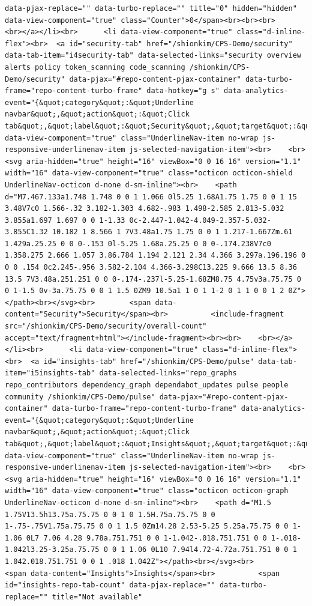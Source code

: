 \documentclass[
  letterpaper,
]{book}
\begin{document}
\begin{verbatim}
data-pjax-replace="" data-turbo-replace="" title="0" hidden="hidden" data-view-component="true" class="Counter">0</span><br><br><br>    <br></a></li><br>      <li data-view-component="true" class="d-inline-flex"><br>  <a id="security-tab" href="/shionkim/CPS-Demo/security" data-tab-item="i4security-tab" data-selected-links="security overview alerts policy token_scanning code_scanning /shionkim/CPS-Demo/security" data-pjax="#repo-content-pjax-container" data-turbo-frame="repo-content-turbo-frame" data-hotkey="g s" data-analytics-event="{&quot;category&quot;:&quot;Underline navbar&quot;,&quot;action&quot;:&quot;Click tab&quot;,&quot;label&quot;:&quot;Security&quot;,&quot;target&quot;:&quot;UNDERLINE_NAV.TAB&quot;}" data-view-component="true" class="UnderlineNav-item no-wrap js-responsive-underlinenav-item js-selected-navigation-item"><br>    <br>              <svg aria-hidden="true" height="16" viewBox="0 0 16 16" version="1.1" width="16" data-view-component="true" class="octicon octicon-shield UnderlineNav-octicon d-none d-sm-inline"><br>    <path d="M7.467.133a1.748 1.748 0 0 1 1.066 0l5.25 1.68A1.75 1.75 0 0 1 15 3.48V7c0 1.566-.32 3.182-1.303 4.682-.983 1.498-2.585 2.813-5.032 3.855a1.697 1.697 0 0 1-1.33 0c-2.447-1.042-4.049-2.357-5.032-3.855C1.32 10.182 1 8.566 1 7V3.48a1.75 1.75 0 0 1 1.217-1.667Zm.61 1.429a.25.25 0 0 0-.153 0l-5.25 1.68a.25.25 0 0 0-.174.238V7c0 1.358.275 2.666 1.057 3.86.784 1.194 2.121 2.34 4.366 3.297a.196.196 0 0 0 .154 0c2.245-.956 3.582-2.104 4.366-3.298C13.225 9.666 13.5 8.36 13.5 7V3.48a.251.251 0 0 0-.174-.237l-5.25-1.68ZM8.75 4.75v3a.75.75 0 0 1-1.5 0v-3a.75.75 0 0 1 1.5 0ZM9 10.5a1 1 0 1 1-2 0 1 1 0 0 1 2 0Z"></path><br></svg><br>        <span data-content="Security">Security</span><br>          <include-fragment src="/shionkim/CPS-Demo/security/overall-count" accept="text/fragment+html"></include-fragment><br><br>    <br></a></li><br>      <li data-view-component="true" class="d-inline-flex"><br>  <a id="insights-tab" href="/shionkim/CPS-Demo/pulse" data-tab-item="i5insights-tab" data-selected-links="repo_graphs repo_contributors dependency_graph dependabot_updates pulse people community /shionkim/CPS-Demo/pulse" data-pjax="#repo-content-pjax-container" data-turbo-frame="repo-content-turbo-frame" data-analytics-event="{&quot;category&quot;:&quot;Underline navbar&quot;,&quot;action&quot;:&quot;Click tab&quot;,&quot;label&quot;:&quot;Insights&quot;,&quot;target&quot;:&quot;UNDERLINE_NAV.TAB&quot;}" data-view-component="true" class="UnderlineNav-item no-wrap js-responsive-underlinenav-item js-selected-navigation-item"><br>    <br>              <svg aria-hidden="true" height="16" viewBox="0 0 16 16" version="1.1" width="16" data-view-component="true" class="octicon octicon-graph UnderlineNav-octicon d-none d-sm-inline"><br>    <path d="M1.5 1.75V13.5h13.75a.75.75 0 0 1 0 1.5H.75a.75.75 0 0 1-.75-.75V1.75a.75.75 0 0 1 1.5 0Zm14.28 2.53-5.25 5.25a.75.75 0 0 1-1.06 0L7 7.06 4.28 9.78a.751.751 0 0 1-1.042-.018.751.751 0 0 1-.018-1.042l3.25-3.25a.75.75 0 0 1 1.06 0L10 7.94l4.72-4.72a.751.751 0 0 1 1.042.018.751.751 0 0 1 .018 1.042Z"></path><br></svg><br>        <span data-content="Insights">Insights</span><br>          <span id="insights-repo-tab-count" data-pjax-replace="" data-turbo-replace="" title="Not available" 
\end{verbatim}
\end{document}
